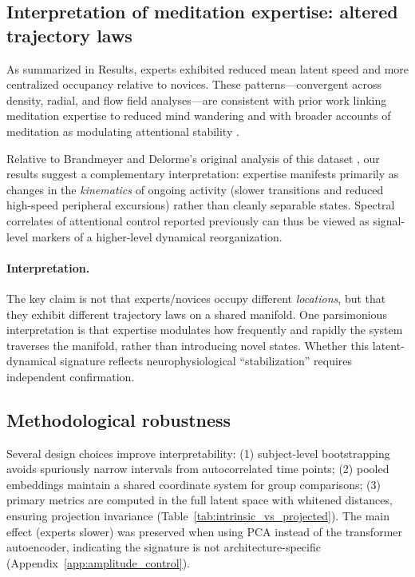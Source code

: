 \documentclass[5p,twocolumn,authoryear]{elsarticle}
\begin{document}
\subsection{Interpretation of meditation expertise: altered trajectory laws}
As summarized in Results, experts exhibited reduced mean latent speed and more centralized occupancy relative to novices. These patterns---convergent across density, radial, and flow field analyses---are consistent with prior work linking meditation expertise to reduced mind wandering \citep{BrandmeyerDelorme2016} and with broader accounts of meditation as modulating attentional stability \citep{Hasenkamp2012,Christoff2009,SmallwoodSchooler2006}.

Relative to Brandmeyer and Delorme's original analysis of this dataset \citep{BrandmeyerDelorme2016}, our results suggest a complementary interpretation: expertise manifests primarily as changes in the \emph{kinematics} of ongoing activity (slower transitions and reduced high-speed peripheral excursions) rather than cleanly separable states. Spectral correlates of attentional control reported previously can thus be viewed as signal-level markers of a higher-level dynamical reorganization.

\paragraph{Interpretation.}
The key claim is not that experts/novices occupy different \emph{locations}, but that they exhibit different trajectory laws on a shared manifold. One parsimonious interpretation is that expertise modulates how frequently and rapidly the system traverses the manifold, rather than introducing novel states. Whether this latent-dynamical signature reflects neurophysiological ``stabilization'' requires independent confirmation.

\subsection{Methodological robustness}
Several design choices improve interpretability: (1) subject-level bootstrapping avoids spuriously narrow intervals from autocorrelated time points; (2) pooled embeddings maintain a shared coordinate system for group comparisons; (3) primary metrics are computed in the full latent space with whitened distances, ensuring projection invariance (Table~\ref{tab:intrinsic_vs_projected}). The main effect (experts slower) was preserved when using PCA instead of the transformer autoencoder, indicating the signature is not architecture-specific (Appendix~\ref{app:amplitude_control}).
\end{document}
